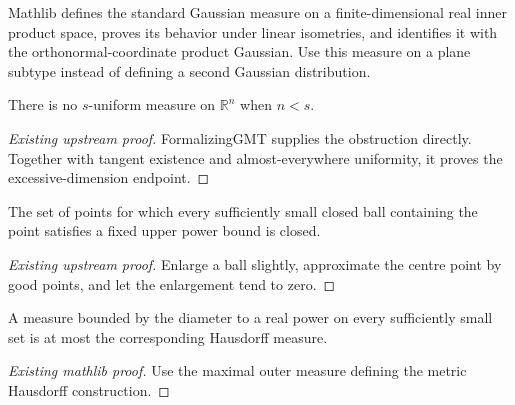 \begin{definition}
\label{mathlib:standard-gaussian}
\leanok
Mathlib defines the standard Gaussian measure on a finite-dimensional real inner
product space, proves its behavior under linear isometries, and identifies it with
the orthonormal-coordinate product Gaussian. Use this measure on a plane subtype
instead of defining a second Gaussian distribution.
\end{definition}

\begin{lemma}
\label{gmt:uniform-dimension-bound}
\leanok
{}
There is no $s$-uniform measure on $\mathbb R^n$ when $n<s$.
\end{lemma}
\begin{proof}[Existing upstream proof]
\leanok
FormalizingGMT supplies the obstruction directly. Together with tangent existence
and almost-everywhere uniformity, it proves the excessive-dimension endpoint.
\end{proof}

\begin{lemma}
\label{gmt:goodballs}
\leanok
{}
The set of points for which every sufficiently small closed ball containing
the point satisfies a fixed upper power bound is closed.
\end{lemma}
\begin{proof}[Existing upstream proof]
\leanok
Enlarge a ball slightly, approximate the centre point by good points,
and let the enlargement tend to zero.
\end{proof}

\begin{lemma}
\label{mathlib:hausdorff-mass-bound}
\leanok
A measure bounded by the diameter to a real power on every sufficiently
small set is at most the corresponding Hausdorff measure.
\end{lemma}
\begin{proof}[Existing mathlib proof]
\leanok
Use the maximal outer measure defining the metric Hausdorff construction.
\end{proof}

